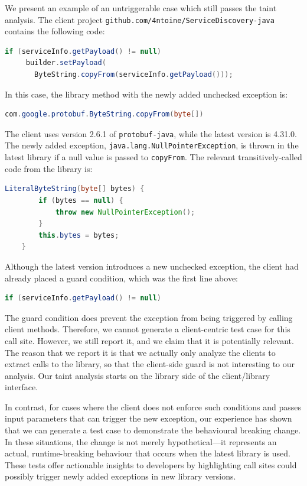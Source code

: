We present an example of an untriggerable case which still passes the taint analysis. The client project \texttt{github.com/4ntoine/ServiceDiscovery-java} contains the following code:

\begin{lstlisting}[language=Java]
    if (serviceInfo.getPayload() != null)
     builder.setPayload(
       ByteString.copyFrom(serviceInfo.getPayload()));
\end{lstlisting}

In this case, the library method with the newly added unchecked exception is:

\begin{lstlisting}[language=Java]
    com.google.protobuf.ByteString.copyFrom(byte[])
\end{lstlisting}

The client uses version 2.6.1 of \texttt{protobuf-java}, while the latest version is 4.31.0. The newly added exception, \texttt{java.lang.NullPointerException}, is thrown in the latest library if a null value is passed to \texttt{copyFrom}. The relevant transitively-called code from the library is:

\begin{lstlisting}[language=Java]
    LiteralByteString(byte[] bytes) {
        if (bytes == null) {
            throw new NullPointerException();
        }
        this.bytes = bytes;
    }
\end{lstlisting}

Although the latest version introduces a new unchecked exception, the client had already placed a guard condition, which was the first line above:

\begin{lstlisting}[language=Java]
  if (serviceInfo.getPayload() != null)
\end{lstlisting}

The guard condition does prevent the exception from being triggered by calling client methods. Therefore, we cannot generate a client-centric test case for this call site. However, we still report it, and we claim that it is potentially relevant. The reason that we report it is that we actually only analyze the clients to extract calls to the library, so that the client-side guard is not interesting to our analysis. Our taint analysis starts on the library side of the client/library interface.

In contrast, for cases where the client does not enforce such conditions and passes input parameters that can trigger the new exception, our experience has shown that we can generate a test case to demonstrate the behavioural breaking change. In these situations, the change is not merely hypothetical—it represents an actual, runtime-breaking behaviour that occurs when the latest library is used. These tests offer actionable insights to developers by highlighting call sites could possibly trigger newly added exceptions in new library versions.


